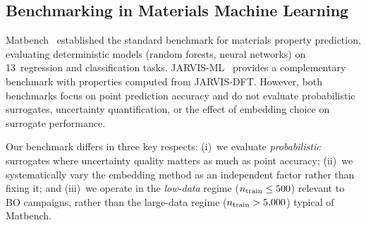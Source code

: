 \subsection{Benchmarking in Materials Machine Learning}

Matbench~\cite{dunn2020benchmarking} established the standard benchmark for materials property prediction, evaluating deterministic models (random forests, neural networks) on 13~regression and classification tasks.
JARVIS-ML~\cite{choudhary2020joint} provides a complementary benchmark with properties computed from JARVIS-DFT.
However, both benchmarks focus on point prediction accuracy and do not evaluate probabilistic surrogates, uncertainty quantification, or the effect of embedding choice on surrogate performance.

Our benchmark differs in three key respects: (i)~we evaluate \emph{probabilistic} surrogates where uncertainty quality matters as much as point accuracy; (ii)~we systematically vary the embedding method as an independent factor rather than fixing it; and (iii)~we operate in the \emph{low-data} regime ($n_{\text{train}} \leq 500$) relevant to BO campaigns, rather than the large-data regime ($n_{\text{train}} > 5{,}000$) typical of Matbench.
